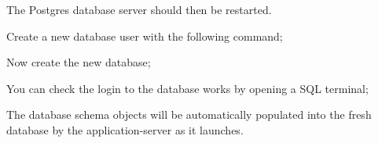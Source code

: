 The Postgres database server should then be restarted.

Create a new database user with the following command;


Now create the new database;


You can check the login to the database works by opening a SQL terminal;


The database schema objects will be automatically populated into the fresh database by the application-server as it launches.

